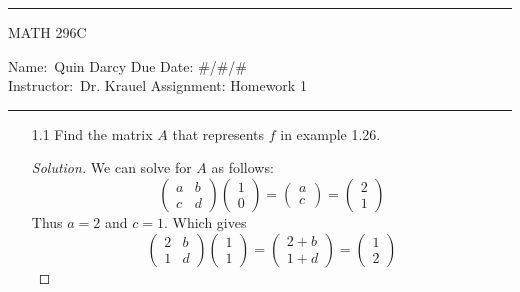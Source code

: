 \documentclass[12pt]{article}
\theoremstyle{definition}
\newenvironment{solution}
{\renewcommand\qedsymbol{$\blacksquare$}\begin{proof}[Solution]}
{\end{proof}}
\begin{document}
    \thispagestyle{empty}\hrule

    \begin{center}
        \vspace{.4cm} { \large MATH 296C}
    \end{center}
    {Name:\ Quin Darcy \hspace{\fill} Due Date: \#/\#/\#   \\
    { Instructor:}\ Dr. Krauel \hspace{\fill} Assignment:
    Homework 1 \\ \hrule}

    \begin{enumerate}
        \item[1.1] Find the matrix $A$ that represents $f$ in example 1.26.
            \begin{solution}
                We can solve for $A$ as follows:
                \begin{equation*}
                    \begin{pmatrix} a & b \\
                    c & d\end{pmatrix}\begin{pmatrix}1 \\
                    0\end{pmatrix} = \begin{pmatrix} a \\
                    c\end{pmatrix}=\begin{pmatrix}2 \\
                    1\end{pmatrix}
                \end{equation*}
                Thus $a=2$ and $c=1$. Which gives 
                \begin{equation*}
                    \begin{pmatrix} 2 & b \\
                    1 & d\end{pmatrix}\begin{pmatrix} 1 \\
                    1\end{pmatrix}=\begin{pmatrix} 2+b \\
                    1+d\end{pmatrix}=\begin{pmatrix}1 \\
                    2\end{pmatrix}

\end{equation*}
\end{solution}
\end{enumerate}
\end{document}
